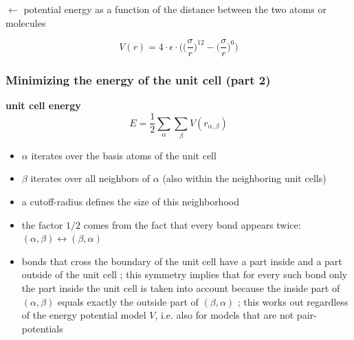 \begin{frame}
\begin{multicols}{2}
    \vspace{0.3em}
    $\leftarrow$ potential energy as a function of the distance between the two atoms or molecules
    
    \vspace{-1em}
    \begin{displaymath}
      V(r) = 4 \cdot \epsilon \cdot \Biggl( \biggl( \frac{\sigma}{r} \biggr)^{12} - \biggl( \frac{\sigma}{r} \biggr)^6 \Biggr)
    \end{displaymath}
    
  \end{multicols}
\end{frame}


\begin{frame}
  \frametitle{Minimizing the energy of the unit cell (part 2)}

  \textbf{unit cell energy}
  \begin{displaymath}
    E = \frac{1}{2} \sum_{\alpha} \sum_{\beta} V(r_{\alpha, \beta})
  \end{displaymath}
  \begin{itemize}
    \item $\alpha$ iterates over the basis atoms of the unit cell
    \item $\beta$ iterates over all neighbors of $\alpha$ (also within the neighboring unit cells)
    \item a cutoff-radius defines the size of this neighborhood
    \item the factor $1/2$ comes from the fact that every bond appears twice: $(\alpha, \beta) \leftrightarrow (\beta, \alpha)$
    \item bonds that cross the boundary of the unit cell have a part inside and a part outside of the unit cell ; this symmetry implies that for every such bond only the part inside the unit cell is taken into account because the inside part of $(\alpha, \beta)$ equals exactly the outside part of $(\beta, \alpha)$ ; this works out regardless of the energy potential model $V$, i.e. also for models that are not pair-potentials 
  \end{itemize}

\end{frame}


